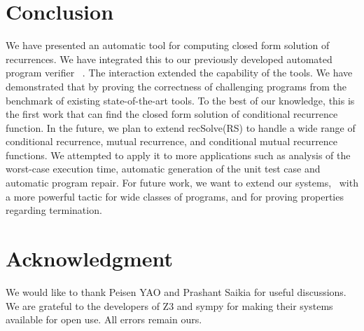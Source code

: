 \section{Conclusion}
\label{sec:conclu}
We have presented an automatic tool for computing closed form solution of recurrences. We have integrated this to our previously developed automated program verifier \SystemName\ . The interaction extended the capability of the tools. We have demonstrated that by proving the correctness of challenging programs
from the benchmark of existing state-of-the-art tools. To the best of our knowledge, this is the first work that can find the closed form solution of conditional recurrence function. In the future, we plan to extend recSolve(RS) to handle a wide range of conditional recurrence, mutual recurrence, and conditional mutual recurrence functions. We attempted to apply it to more applications such as analysis of the worst-case execution time, automatic generation of the unit test case and automatic program repair. For future work, we want to extend our systems, \SystemName\ with a more powerful tactic for wide classes of programs, and for proving properties regarding termination.

\section*{Acknowledgment}

We would like to thank Peisen YAO and Prashant Saikia for useful
discussions. We are grateful to the developers of
Z3 and sympy for making their systems available for open use. All errors remain ours.










 


